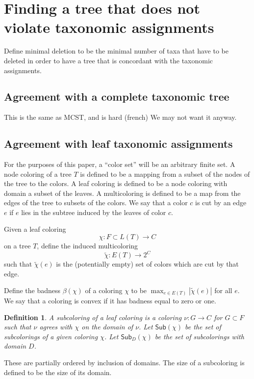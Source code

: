 \documentclass{amsart}
\newcommand{\col}{\chi}
\newcommand{\colt}{\tilde{\chi}}
\newcommand{\subcolS}{\mathsf{Sub}}
\newcommand{\bad}{\beta}
\newtheorem{defn}{Definition}
\begin{document}

\section{Finding a tree that does not violate taxonomic assignments}
Define minimal deletion to be the minimal number of taxa that have to be deleted in order to have a tree that is concordant with the taxonomic assignments.

\subsection{Agreement with a complete taxonomic tree}
This is the same as MCST, and is hard (french)
We may not want it anyway.

\subsection{Agreement with leaf taxonomic assignments}

For the purposes of this paper, a ``color set'' will be an arbitrary finite set.
A node coloring of a tree $T$ is defined to be a mapping from a subset of the nodes of the tree to the colors.
A leaf coloring is defined to be a node coloring with domain a subset of the leaves.
A multicoloring is defined to be a map from the edges of the tree to subsets of the colors.
We say that a color $c$ is cut by an edge $e$ if $e$ lies in the subtree induced by the leaves of color $c$.

Given a leaf coloring
\[
\col: F \subset L(T) \rightarrow C
\]
on a tree $T$, define the induced multicoloring
\[
\colt: E(T) \rightarrow 2^C
\]
such that $\colt(e)$ is the (potentially empty) set of colors which are cut by that edge.

Define the badness $\bad(\col)$ of a coloring $\col$ to be $\max_{e \in E(T)} |\colt(e)| $ for all $e$.
We say that a coloring is convex if it has badness equal to zero or one.

\begin{defn}
  A subcoloring of a leaf coloring is a coloring $\nu: G \rightarrow C$ for $G \subset F$ such that $\nu$ agrees with $\col$ on the domain of $\nu$.
  Let $\subcolS(\col)$ be the set of subcolorings of a given coloring $\col$.
  Let $\subcolS_D(\col)$ be the set of subcolorings with domain $D$.
\end{defn}
These are partially ordered by inclusion of domains.
The size of a subcoloring is defined to be the size of its domain.
\end{document}
